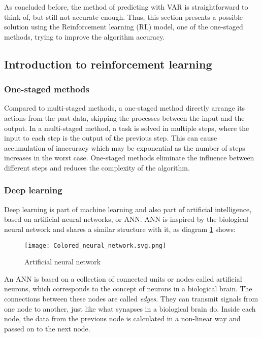 \documentclass{mcmthesis}
\begin{document}
As concluded before,
the method of predicting with VAR is straightforward to think of,
but still not accurate enough.
Thus, this section presents a possible solution using the Reinforcement learning (RL) model, one of the one-staged methods,
trying to improve the algorithm accuracy.

\subsection{Introduction to reinforcement learning}

\subsubsection{One-staged methods}

Compared to multi-staged methods, a one-staged method directly arrange its actions from the past data, skipping the processes between the input and the output\cite{lecun2004autonomous}.
In a multi-staged method, a task is solved in multiple steps, where the input to each step is the output of the previous step.
This can cause accumulation of inaccuracy which may be exponential as the number of steps increases in the worst case.
One-staged methods eliminate the influence between different steps and reduces the complexity of the algorithm.

\subsubsection{Deep learning}

Deep learning is part of machine learning and also part of artificial intelligence,
based on artificial neural networks, or ANN.
ANN is inspired by the biological neural network
and shares a similar structure with it, as diagram \ref{ANN} shows:

\begin{figure}[h]
\small
\centering
\texttt{[image: Colored\_neural\_network.svg.png]}
\caption{Artificial neural network} \label{ANN}
\end{figure}

An ANN is based on a collection of connected units or nodes called artificial neurons,
which corresponds to the concept of neurons in a biological brain.
The connections between these nodes are called \textit{edges}.
They can transmit signals from one node to another,
just like what synapses in a biological brain do.
Inside each node, the data from the previous node is calculated in a non-linear way
and passed on to the next node.
\end{document}

